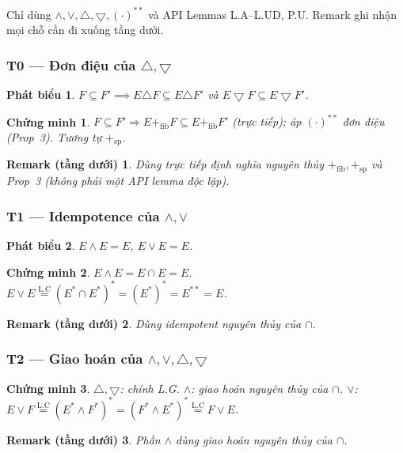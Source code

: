 \documentclass[11pt]{article}
\theoremstyle{plainlabel}
\newtheorem*{phatbieu}{Phát biểu}
\newtheorem*{chungminh}{Chứng minh}
\newtheorem*{remarkbox}{Remark (tầng dưới)}
\begin{document}
Chỉ dùng $\wedge,\vee,\triangle,\bigtriangledown,(\cdot)^{**}$ và API Lemmas L.A--L.UD, P.U. Remark ghi nhận mọi chỗ cần đi xuống tầng dưới.

\subsubsection*{T0 --- Đơn điệu của $\triangle,\bigtriangledown$}
\begin{phatbieu} $F\subseteq F'\implies E\triangle F\subseteq E\triangle F'$ và $E\bigtriangledown F\subseteq E\bigtriangledown F'$. \end{phatbieu}
\begin{chungminh} $F\subseteq F'\Rightarrow E+_{\mathrm{fib}}F\subseteq E+_{\mathrm{fib}}F'$ (trực tiếp); áp $(\cdot)^{**}$ đơn điệu (Prop~3). Tương tự $+_{\mathrm{sp}}$. \end{chungminh}
\begin{remarkbox} Dùng trực tiếp định nghĩa nguyên thủy $+_{\mathrm{fib}},+_{\mathrm{sp}}$ và Prop~3 (không phải một API lemma độc lập). \end{remarkbox}

\subsubsection*{T1 --- Idempotence của $\wedge,\vee$}
\begin{phatbieu} $E\wedge E=E$, $E\vee E=E$. \end{phatbieu}
\begin{chungminh} $E\wedge E=E\cap E=E$. $E\vee E\overset{\text{L.C}}{=}(E^*\cap E^*)^*=(E^*)^{*}=E^{**}=E$. \end{chungminh}
\begin{remarkbox} Dùng idempotent nguyên thủy của $\cap$. \end{remarkbox}

\subsubsection*{T2 --- Giao hoán của $\wedge,\vee,\triangle,\bigtriangledown$}
\begin{chungminh} $\triangle,\bigtriangledown$: chính L.G. $\wedge$: giao hoán nguyên thủy của $\cap$. $\vee$: $E\vee F\overset{\text{L.C}}=(E^*\wedge F^*)^*=(F^*\wedge E^*)^*\overset{\text{L.C}}=F\vee E$. \end{chungminh}
\begin{remarkbox} Phần $\wedge$ dùng giao hoán nguyên thủy của $\cap$. \end{remarkbox}
\end{document}
